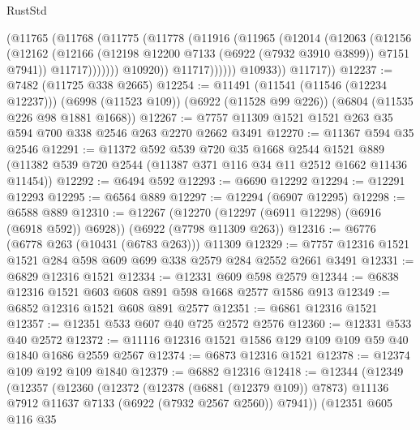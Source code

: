 \begin{lexlean}{RustStd}
\begin{coremodule}
                      (@11765
                        (@11768
                          (@11775
                            (@11778
                              (@11916
                                (@11965
                                  (@12014
                                    (@12063
                                      (@12156
                                        (@12162
                                          (@12166
                                            (@12198
                                              @12200
                                              @7133
                                              (@6922 (@7932 @3910 @3899))
                                              @7151
                                              @7941))
                                          @11717)))))))
                            @10920))
                        @11717))))))
            @10933))
        @11717))
@12237 := @7482 (@11725 @338 @2665)
@12254 := @11491
    (@11541 (@11546 (@12234 @12237)))
    (@6998 (@11523 @109))
    (@6922 (@11528 @99 @226))
    (@6804 (@11535 @226 @98 @1881 @1668))
@12267 := @7757 @11309 @1521 @1521 @263 @35 @594 @700 @338 @2546 @263 @2270 @2662 @3491
@12270 := @11367 @594 @35 @2546
@12291 := @11372
    @592
    @539
    @720
    @35
    @1668
    @2544
    @1521
    @889
    (@11382 @539 @720 @2544 (@11387 @371 @116 @34 @11 @2512 @1662 @11436 @11454))
@12292 := @6494 @592
@12293 := @6690 @12292
@12294 := @12291 @12293
@12295 := @6564 @889
@12297 := @12294 (@6907 @12295)
@12298 := @6588 @889
@12310 := @12267
    (@12270 (@12297 (@6911 @12298) (@6916 (@6918 @592)) @6928))
    (@6922 (@7798 @11309 @263))
@12316 := @6776 (@6778 @263 (@10431 (@6783 @263))) @11309
@12329 := @7757 @12316 @1521 @1521 @284 @598 @609 @699 @338 @2579 @284 @2552 @2661 @3491
@12331 := @6829 @12316 @1521
@12334 := @12331 @609 @598 @2579
@12344 := @6838 @12316 @1521 @603 @608 @891 @598 @1668 @2577 @1586 @913
@12349 := @6852 @12316 @1521 @608 @891 @2577
@12351 := @6861 @12316 @1521
@12357 := @12351 @533 @607 @40 @725 @2572 @2576
@12360 := @12331 @533 @40 @2572
@12372 := @11116 @12316 @1521 @1586 @129 @109 @109 @59 @40 @1840 @1686 @2559 @2567
@12374 := @6873 @12316 @1521
@12378 := @12374 @109 @192 @109 @1840
@12379 := @6882 @12316
@12418 := @12344
    (@12349
      (@12357
        (@12360
          (@12372
            (@12378 (@6881 (@12379 @109)) @7873)
            @11136
            @7912
            @11637
            @7133
            (@6922 (@7932 @2567 @2560))
            @7941))
        (@12351
          @605
          @116
          @35

\end{coremodule}
\end{lexlean}

